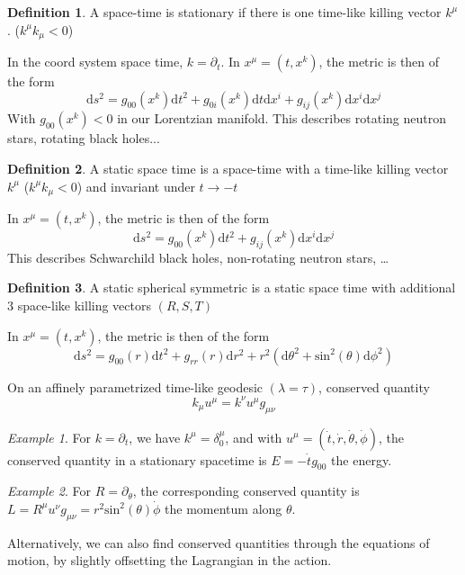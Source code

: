 \documentclass[a4paper]{book}
\theoremstyle{definition}
\newtheorem{definition}{Definition}[section]
\theoremstyle{remark}
\newtheorem*{example}{Example}
\begin{document}
\begin{definition}
    A space-time is stationary if there is one time-like killing vector $k^\mu$. ($k^\mu k_\mu < 0$)
\end{definition}
In the coord system space time, $k = \partial_t$. In $x^\mu = (t, x^k)$, the metric is then of the form 
\begin{equation}
    \text{d}s^2 = g_{00}(x^k)\text{d}t^2 + g_{0i}(x^k)\text{d}t\text{d}x^i + g_{ij}(x^k)\text{d}x^i\text{d}x^j
\end{equation}
With $g_{00}(x^k)<0$ in our Lorentzian manifold. This describes rotating neutron stars, rotating black holes...

\begin{definition}
    A static space time is a space-time with a time-like killing vector $k^\mu$ ($k^\mu k_\mu < 0$) and invariant under $t \rightarrow -t$
\end{definition}
In $x^\mu = (t, x^k)$, the metric is then of the form 
\begin{equation}
    \text{d}s^2 = g_{00}(x^k)\text{d}t^2 + g_{ij}(x^k)\text{d}x^i\text{d}x^j
\end{equation}
This describes Schwarchild black holes, non-rotating neutron stars, \dots 


\begin{definition}
    A static spherical symmetric is a static space time with additional 3 space-like killing vectors $(R, S, T)$
\end{definition}
In $x^\mu = (t, x^k)$, the metric is then of the form 
\begin{equation}
    \text{d}s^2 = g_{00}(r)\text{d}t^2 + g_{rr}(r)\text{d}r^2 + r^2(\text{d}\theta^2 + \text{sin}^2(\theta)\text{d}\phi^2)
\end{equation}

On an affinely parametrized time-like geodesic $(\lambda = \tau)$, conserved quantity 
\begin{equation}
    k_\mu u^\mu = k^\nu u^\mu g_{\mu\nu}
\end{equation}
\begin{example}
    For $k = \partial_t$, we have $k^\mu = \delta^\mu_0$, and with $u^\mu = (\dot{t}, \dot{r}, \dot{\theta}, \dot{\phi})$, the conserved quantity in a stationary spacetime is $E = -\dot{t}g_{00}$ the energy. 
\end{example}
\begin{example}
    For $R =\partial_\theta$, the corresponding conserved quantity is $L = R^\mu u^\nu g_{\mu\nu} = r^2 \text{sin}^2(\theta)\dot{\phi}$ the momentum along $\theta$. 
\end{example}
Alternatively, we can also find conserved quantities through the equations of motion, by slightly offsetting the Lagrangian in the action. 
\end{document}
